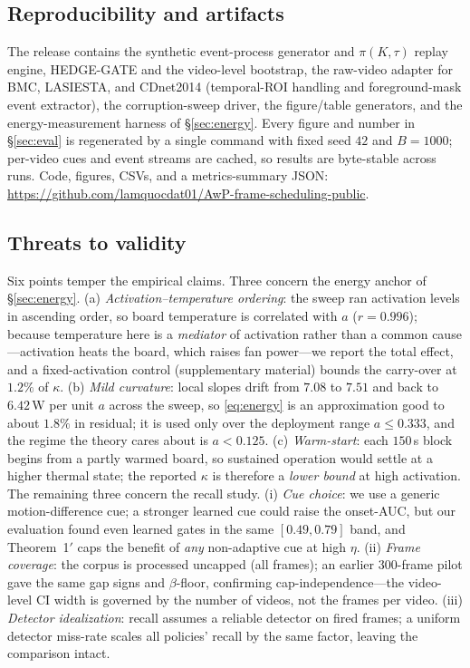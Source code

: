 ﻿\documentclass[lettersize,journal]{IEEEtran}
\begin{document}
\subsection{Reproducibility and artifacts}
The release contains the synthetic event-process generator and $\pi(K,\tau)$ replay engine, HEDGE-GATE and the video-level bootstrap, the raw-video adapter for BMC, LASIESTA, and CDnet2014 (temporal-ROI handling and foreground-mask event extractor), the corruption-sweep driver, the figure/table generators, and the energy-measurement harness of \S\ref{sec:energy}. Every figure and number in \S\ref{sec:eval} is regenerated by a single command with fixed seed $42$ and $B{=}1000$; per-video cues and event streams are cached, so results are byte-stable across runs. Code, figures, CSVs, and a metrics-summary JSON: \url{https://github.com/lamquocdat01/AwP-frame-scheduling-public}.

\subsection{Threats to validity}
Six points temper the empirical claims. Three concern the energy anchor of \S\ref{sec:energy}. (a) \emph{Activation--temperature ordering}: the sweep ran activation levels in ascending order, so board temperature is correlated with $a$ ($r=0.996$); because temperature here is a \emph{mediator} of activation rather than a common cause---activation heats the board, which raises fan power---we report the total effect, and a fixed-activation control (supplementary material) bounds the carry-over at $1.2\%$ of $\kappa$. (b) \emph{Mild curvature}: local slopes drift from $7.08$ to $7.51$ and back to $6.42$\,W per unit $a$ across the sweep, so \eqref{eq:energy} is an approximation good to about $1.8\%$ in residual; it is used only over the deployment range $a\le0.333$, and the regime the theory cares about is $a<0.125$. (c) \emph{Warm-start}: each $150$\,s block begins from a partly warmed board, so sustained operation would settle at a higher thermal state; the reported $\kappa$ is therefore a \emph{lower bound} at high activation. The remaining three concern the recall study. (i) \emph{Cue choice}: we use a generic motion-difference cue; a stronger learned cue could raise the onset-AUC, but our evaluation found even learned gates in the same $[0.49,0.79]$ band, and Theorem~1$'$ caps the benefit of \emph{any} non-adaptive cue at high $\eta$. (ii) \emph{Frame coverage}: the corpus is processed uncapped (all frames); an earlier $300$-frame pilot gave the same gap signs and $\beta$-floor, confirming cap-independence---the video-level CI width is governed by the number of videos, not the frames per video. (iii) \emph{Detector idealization}: recall assumes a reliable detector on fired frames; a uniform detector miss-rate scales all policies' recall by the same factor, leaving the comparison intact.
\end{document}
